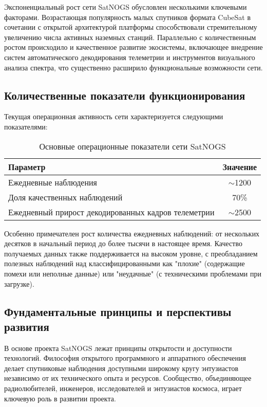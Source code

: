 Экспоненциальный рост сети SatNOGS обусловлен несколькими ключевыми факторами.
Возрастающая популярность малых спутников формата CubeSat в сочетании с
открытой архитектурой платформы способствовали стремительному увеличению числа
активных наземных станций. Параллельно с количественным ростом происходило и
качественное развитие экосистемы, включающее внедрение систем автоматического
декодирования телеметрии и инструментов визуального анализа спектра, что
существенно расширило функциональные возможности сети.

\subsection{Количественные показатели функционирования}

Текущая операционная активность сети характеризуется следующими показателями:

\begin{table}[h]
	\centering
	\begin{tabular}{|l|c|}
		\hline
		\textbf{Параметр}                                   & \textbf{Значение} \\
		\hline
		Ежедневные наблюдения                               & $\sim$1200        \\
		Доля качественных наблюдений                        & 70\%              \\
		Ежедневный прирост декодированных кадров телеметрии & $\sim$2500        \\
		\hline
	\end{tabular}
	\caption{Основные операционные показатели сети SatNOGS}
	\label{tab:satnogs_stats}
\end{table}

Особенно примечателен рост количества ежедневных наблюдений: от нескольких
десятков в начальный период до более тысячи в настоящее время. Качество
получаемых данных также поддерживается на высоком уровне, с преобладанием
полезных наблюдений над классифицированными как "плохие" (содержащие помехи или
неполные данные) или "неудачные" (с техническими проблемами при загрузке).

\subsection{Фундаментальные принципы и перспективы развития}

В основе проекта SatNOGS лежат принципы открытости и доступности технологий.
Философия открытого программного и аппаратного обеспечения делает спутниковые
наблюдения доступными широкому кругу энтузиастов независимо от их технического
опыта и ресурсов. Сообщество, объединяющее радиолюбителей, инженеров,
исследователей и энтузиастов космоса, играет ключевую роль в развитии проекта.

